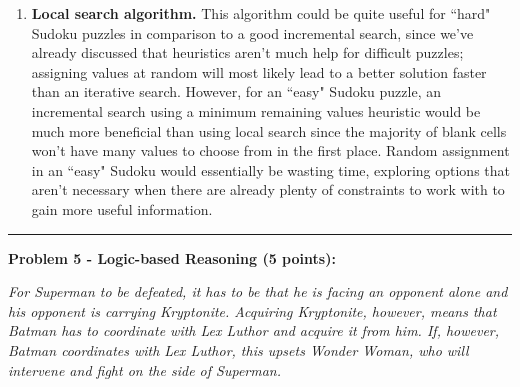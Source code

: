 \documentclass[12pt]{article}
\begin{document}
\begin{enumerate}[label=(\alph*)]
    \item \textbf{Local search algorithm.} This algorithm could be quite useful for ``hard" Sudoku puzzles in comparison to a good incremental search, since we've already discussed that heuristics aren't much help for difficult puzzles; assigning values at random will most likely lead to a better solution faster than an iterative search. However, for an ``easy" Sudoku puzzle, an incremental search using a minimum remaining values heuristic would be much more beneficial than using local search since the majority of blank cells won't have many values to choose from in the first place. Random assignment in an ``easy" Sudoku would essentially be wasting time, exploring options that aren't necessary when there are already plenty of constraints to work with to gain more useful information.
    
    

\end{enumerate}


\rule{\linewidth}{0.4pt}
\vspace{.2cm}

\textbf{Problem 5 - Logic-based Reasoning (5 points):}

\vspace{.5cm}

\noindent \textit{For Superman to be defeated, it has to be that he is facing an opponent alone and his opponent is carrying Kryptonite. Acquiring Kryptonite, however, means that Batman has to coordinate with Lex Luthor and acquire it from him. If, however, Batman coordinates with Lex Luthor, this upsets Wonder Woman, who will intervene and fight on the side of Superman.}
\end{document}
